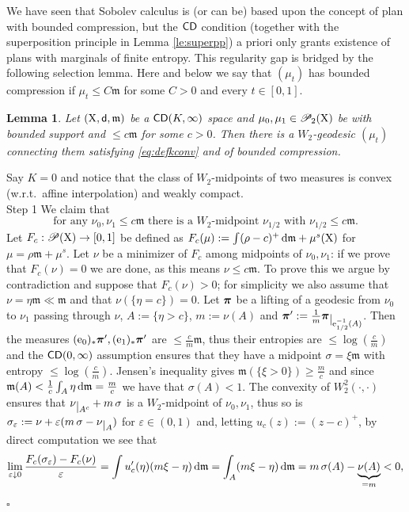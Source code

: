 \documentclass[11pt]{article}
\numberwithin{equation}{section}
\newtheorem{lemma}[theorem]{Lemma}
\newenvironment{idea}{\removelastskip\par\medskip   %
\noindent{\em Idea of the proof} \rm}{\penalty-20\null\hfill$\square$\par\medbreak}
\newcommand{\ppi}{{\mbox{\boldmath$\pi$}}}
\newcommand{\restr}[1]{\lower3pt\hbox{$|_{#1}$}}
\newcommand{\pr}{\mathscr P}
\newcommand{\prd}{\mathscr P_2}
\newcommand{\e}{{\rm e}}
\newcommand{\X}{{\rm X}}
\newcommand{\sfd}{{\sf d}}
\newcommand{\mm}{{\mathfrak m}}
\newcommand{\CD}{{\sf CD}}
\renewcommand{\d}{{\rm d}}
\newcommand{\eps}{\varepsilon}
\begin{document}
We have seen that Sobolev calculus is (or can be) based upon the concept of plan with bounded compression, but the $\CD$ condition (together with the superposition principle in Lemma \ref{le:superpp}) a priori only grants existence of plans with marginals of finite entropy. This regularity gap is bridged by the following selection lemma. Here and below we say that $(\mu_t)$ has bounded compression if $\mu_t\leq C\mm$ for some $C>0$ and every $t\in[0,1]$.
\begin{lemma}\label{le:tapio}
Let $(\X,\sfd,\mm)$ be a $\CD(K,\infty)$ space and $\mu_0,\mu_1\in\prd(\X)$ be with bounded support and $\leq c\mm$ for some $c>0$. Then there is a $W_2$-geodesic $(\mu_t)$ connecting them satisfying \eqref{eq:defkconv}   and of bounded compression.
\end{lemma}
\begin{idea} Say $K=0$ and  notice that the class of $W_2$-midpoints of two measures  is  convex (w.r.t.\ affine interpolation) and weakly compact. \\
{\sc Step 1} We claim that 
\begin{equation}
\label{eq:pertapio}
\text{for any $\nu_0,\nu_1\leq c\mm$ there is a $W_2$-midpoint $\nu_{1/2}$ with $\nu_{1/2}\leq c\mm$.}
\end{equation}
Let $F_c:\pr(\X)\to[0,1]$ be defined as $F_{c}(\mu):=\int(\rho-c)^+\,\d\mm+\mu^s(\X)$ for  $\mu=\rho\mm+\mu^s$. Let $ \nu$  be a minimizer of $F_c$ among midpoints of $\nu_0,\nu_1$: if we prove that $F_{c}(\nu)=0$ we are done, as this means $\nu\leq c\mm$. To prove this we argue  by contradiction and suppose that $F_{c}(\nu)>0$; for simplicity we also assume that $\nu=\eta\mm\ll\mm$ and that $\nu(\{\eta=c\})=0$. Let $ \ppi$ be a lifting of a geodesic from $\nu_0$ to $\nu_1$ passing through $\nu$,  $A:=\{\eta> c\}$, $ m:= \nu(A)$ and $ \ppi':=\tfrac1{ m}\ppi\restr{\e_{1/2}^{-1}(A)}$. Then the measures $(\e_0)_*\ppi',(\e_1)_*\ppi'$ are $\leq \tfrac c{ m}\mm$, thus their entropies are $\leq \log(\tfrac c{ m})$ and the $\CD(0,\infty)$ assumption ensures that they have a midpoint $\sigma=\xi\mm$ with entropy $\leq \log(\tfrac c{ m})$.  Jensen's inequality gives  $\mm(\{\xi>0\})\geq \frac{ m}c$ and since  $\mm(A)<\frac1c\int_A\eta\,\d\mm=\frac{ m}{c}$ we have  that $\sigma(A)<1$. The convexity of $W_2^2(\cdot,\cdot)$ ensures that $\nu\restr{A^c}+ m\,\sigma$ is a $W_2$-midpoint of $\nu_0,\nu_1$, thus so is  $\sigma_\eps:=\nu+\eps( m\,\sigma-\nu\restr A )$ for $\eps\in(0,1)$ and, letting $u_c(z):=(z-c)^+$, by direct computation we see that 
\[
\lim_{\eps\downarrow0}\frac{F_{c}(\sigma_\eps)-F_{c}(\nu)}\eps=\int u_c'(\eta)( m\xi- \eta)\,\d\mm=\int_A( m\xi- \eta)\,\d\mm= m\,\sigma(A)-\underbrace{ \nu(A)}_{= m}<0,
\]
\end{idea}
\end{document}
